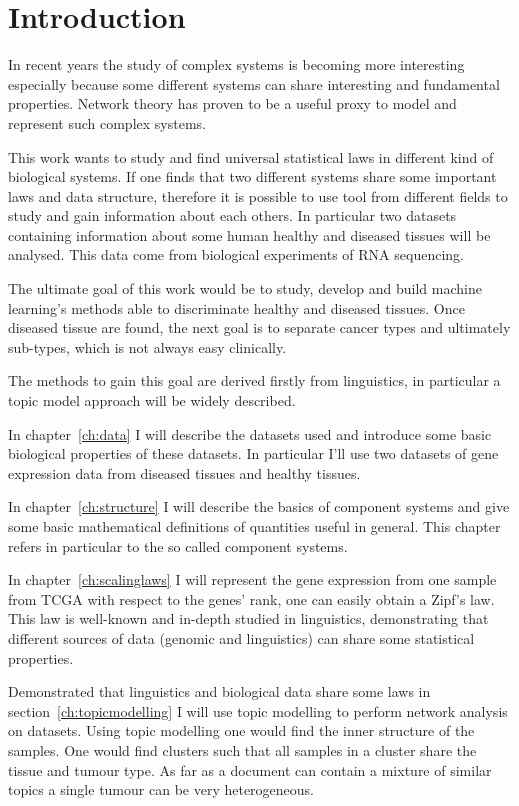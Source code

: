 \chapter{Introduction}\label{ch:intro}
In recent years the study of complex systems is becoming more interesting 
especially because some different systems can share interesting and fundamental 
properties. Network theory has proven to be a useful proxy to model and represent such complex 
systems.

This work wants to study and find universal statistical laws in different kind of biological systems.
If one finds that two different systems share some important laws and data structure, therefore it is possible to use tool from different fields 
to study and gain information about each others. 
In particular two datasets containing information about some human healthy and 
diseased tissues will be analysed. This data come from biological experiments of 
RNA sequencing.

The ultimate goal of this work would be to study, develop and build machine learning's methods able to 
discriminate healthy and diseased tissues. Once diseased tissue are found, the 
next goal is to separate cancer types and ultimately sub-types, which is not 
always easy clinically.

The methods to gain this goal are derived firstly from linguistics, in 
particular a topic model approach will be widely described.

In chapter~\ref{ch:data} I will describe the datasets used and introduce some 
basic biological properties of these datasets. In particular I'll use two datasets of gene expression data from 
diseased tissues and healthy tissues.

In chapter~\ref{ch:structure} I will describe the basics of component systems 
and give some basic mathematical definitions of quantities useful in general. 
This chapter refers in particular to the so called component systems.

In chapter~\ref{ch:scalinglaws} I will represent the gene expression from one sample from TCGA 
with respect to the genes' rank, one can easily obtain a Zipf's law. This law is 
well-known and in-depth studied in linguistics, demonstrating that different sources of data (genomic and linguistics) 
can share some statistical properties.

Demonstrated that linguistics and biological data share some laws in section~\ref{ch:topicmodelling} 
I will use topic modelling to perform network analysis on datasets.
Using topic modelling one would find the inner structure of the samples.
One would find clusters such that all samples in a cluster share the tissue and tumour type.
As far as a document can contain a mixture of similar topics a single tumour can be very heterogeneous.

